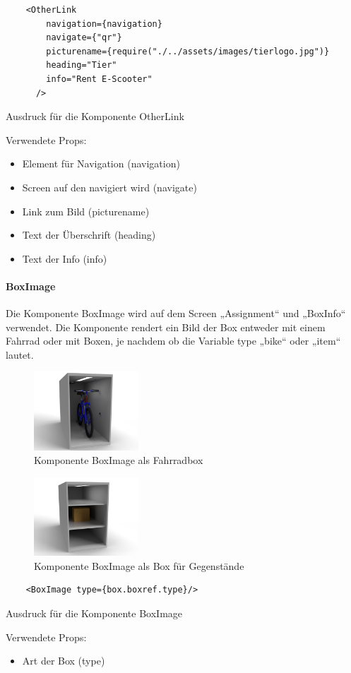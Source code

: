 \begin{listing}

  \begin{verbatim}
    <OtherLink
        navigation={navigation}
        navigate={"qr"}
        picturename={require("./../assets/images/tierlogo.jpg")}
        heading="Tier"
        info="Rent E-Scooter"
      />
\end{verbatim}
  \caption{Ausdruck für die Komponente OtherLink}
  \label{lst:jsxotherlink}
\end{listing}
Verwendete Props:
\begin{itemize}
  \item Element für Navigation (navigation)
  \item Screen auf den navigiert wird (navigate)
  \item Link zum Bild (picturename)
  \item Text der Überschrift (heading)
  \item Text der Info (info)
\end{itemize}


\paragraph{BoxImage}Die Komponente BoxImage wird auf dem Screen „Assignment“ und „BoxInfo“ verwendet. Die Komponente rendert ein Bild der Box entweder mit einem Fahrrad oder mit Boxen, je nachdem ob die Variable type „bike“ oder „item“ lautet.

\begin{figure}[H]
  \centering
  \includegraphics[width=0.35\textwidth]{images/box_bike.png}
  \caption{Komponente BoxImage als Fahrradbox}
  \label{fig:boximagebike}
\end{figure}
\begin{figure}[H]
  \centering
  \includegraphics[width=0.35\textwidth]{images/box_item.png}
  \caption{Komponente BoxImage als Box für Gegenstände}
  \label{fig:boximageitem}
\end{figure}

\begin{listing}
  \begin{verbatim}
    <BoxImage type={box.boxref.type}/>
\end{verbatim}
  \caption{Ausdruck für die Komponente BoxImage}
  \label{lst:jsxboximage}
\end{listing}
Verwendete Props:
\begin{itemize}
  \item Art der Box (type)
\end{itemize}

